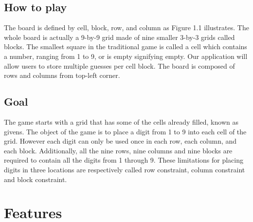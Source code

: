 \documentclass{article}
\begin{document}
\subsection{How to play}
The board is defined by cell, block, row, and column as Figure 1.1 illustrates. The whole board is actually a 9-by-9 grid made of nine smaller 3-by-3 grids called blocks. The smallest square in the traditional game is called a cell which contains a number, ranging from 1 to 9, or is empty signifying empty. Our application will allow users to store multiple guesses per cell block. The board is composed of rows and columns from top-left corner.

\subsection{Goal}
The game starts with a grid that has some of the cells already filled, known as givens. The object of the game is to place a digit from 1 to 9 into each cell of the grid. However each digit can only be used once in each row, each column, and each block. Additionally, all the nine rows, nine columns and nine blocks are required to contain all the digits from 1 through 9. These limitations for placing digits in three locations are respectively called row constraint, column constraint and block constraint.

\section{Features}
\end{document}
